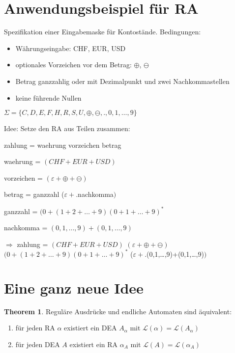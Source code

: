 \documentclass[11pt]{article} %
\theoremstyle{definition}
\newtheorem{theorem}{Theorem}
\begin{document}
\section{Anwendungsbeispiel für RA}

Spezifikation einer Eingabemaske für Kontostände. Bedingungen:
\begin{itemize}
\item Währungseingabe: CHF, EUR, USD
\item optionales Vorzeichen vor dem Betrag: $\oplus$, $\ominus$
\item Betrag ganzzahlig oder mit Dezimalpunkt und zwei Nachkommastellen
\item keine führende Nullen
\end{itemize}

$\Sigma = \{C,D,E,F,H,R,S,U,\oplus, \ominus, ., 0, 1, \dots, 9\}$

Idee: Setze den RA aus Teilen zusammen:

zahlung = waehrung vorzeichen betrag

waehrung = $(CHF + EUR + USD)$

vorzeichen = $(\varepsilon + \oplus + \ominus)$

betrag = ganzzahl ($\varepsilon + .$nachkomma$)$

ganzzahl  = $(0 + (1+2+\dots+9)(0 + 1 +\dots+9)^*$

nachkomma = $(0,1,\dots,9)+(0,1,\dots,9)$

\newcommand{\enea}{$\varepsilon$-NEA}

$\Rightarrow $ zahlung =  $(CHF + EUR + USD)$ $(\varepsilon + \oplus + \ominus)$ $(0 + (1+2+\dots+9)(0 + 1 +\dots+9)^*$
($\varepsilon + .$(0,1,\dots,9)+(0,1,\dots,9)$)$

\section{Eine ganz neue Idee}

\begin{theorem}
Reguläre Ausdrücke und endliche Automaten sind äquivalent:
\begin{enumerate}
\item für jeden RA $\alpha$ existiert ein DEA $A_\alpha$ mit $\mathcal{L}(\alpha) = \mathcal{L}(A_\alpha)$
\item für jeden DEA $A$ existiert ein RA $\alpha_A$ mit $\mathcal{L}(A) = \mathcal{L}(\alpha_A)$
\end{enumerate}
\end{theorem}
\end{document}
